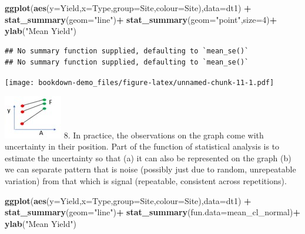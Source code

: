 \documentclass[
]{book}
\newenvironment{Shaded}{\begin{snugshade}}{\end{snugshade}}
\newcommand{\DataTypeTok}[1]{\textcolor[rgb]{0.13,0.29,0.53}{#1}}
\newcommand{\DecValTok}[1]{\textcolor[rgb]{0.00,0.00,0.81}{#1}}
\newcommand{\KeywordTok}[1]{\textcolor[rgb]{0.13,0.29,0.53}{\textbf{#1}}}
\newcommand{\NormalTok}[1]{#1}
\newcommand{\OperatorTok}[1]{\textcolor[rgb]{0.81,0.36,0.00}{\textbf{#1}}}
\newcommand{\StringTok}[1]{\textcolor[rgb]{0.31,0.60,0.02}{#1}}
\begin{document}
\begin{Shaded}
\begin{Highlighting}[]
\KeywordTok{ggplot}\NormalTok{(}\KeywordTok{aes}\NormalTok{(}\DataTypeTok{y=}\NormalTok{Yield,}\DataTypeTok{x=}\NormalTok{Type,}\DataTypeTok{group=}\NormalTok{Site,}\DataTypeTok{colour=}\NormalTok{Site),}\DataTypeTok{data=}\NormalTok{dt1) }\OperatorTok{+}
\StringTok{  }\KeywordTok{stat_summary}\NormalTok{(}\DataTypeTok{geom=}\StringTok{"line"}\NormalTok{)}\OperatorTok{+}
\StringTok{    }\KeywordTok{stat_summary}\NormalTok{(}\DataTypeTok{geom=}\StringTok{"point"}\NormalTok{,}\DataTypeTok{size=}\DecValTok{4}\NormalTok{)}\OperatorTok{+}
\StringTok{      }\KeywordTok{ylab}\NormalTok{(}\StringTok{"Mean Yield"}\NormalTok{)}
\end{Highlighting}
\end{Shaded}

\begin{verbatim}
## No summary function supplied, defaulting to `mean_se()`
## No summary function supplied, defaulting to `mean_se()`
\end{verbatim}

\texttt{[image: bookdown-demo\_files/figure-latex/unnamed-chunk-11-1.pdf]}

\includegraphics{img/Picture3.jpg}
8. In practice, the observations on the graph come with uncertainty in their position. Part of the function of statistical analysis is to estimate the uncertainty so that (a) it can also be represented on the graph (b) we can separate pattern that is noise (possibly just due to random, unrepeatable variation) from that which is signal (repeatable, consistent across repetitions).

\begin{Shaded}
\begin{Highlighting}[]
\KeywordTok{ggplot}\NormalTok{(}\KeywordTok{aes}\NormalTok{(}\DataTypeTok{y=}\NormalTok{Yield,}\DataTypeTok{x=}\NormalTok{Type,}\DataTypeTok{group=}\NormalTok{Site,}\DataTypeTok{colour=}\NormalTok{Site),}\DataTypeTok{data=}\NormalTok{dt1) }\OperatorTok{+}
\StringTok{  }\KeywordTok{stat_summary}\NormalTok{(}\DataTypeTok{geom=}\StringTok{"line"}\NormalTok{)}\OperatorTok{+}
\StringTok{    }\KeywordTok{stat_summary}\NormalTok{(}\DataTypeTok{fun.data=}\NormalTok{mean_cl_normal)}\OperatorTok{+}
\StringTok{      }\KeywordTok{ylab}\NormalTok{(}\StringTok{"Mean Yield"}\NormalTok{)}
\end{Highlighting}
\end{Shaded}
\end{document}
